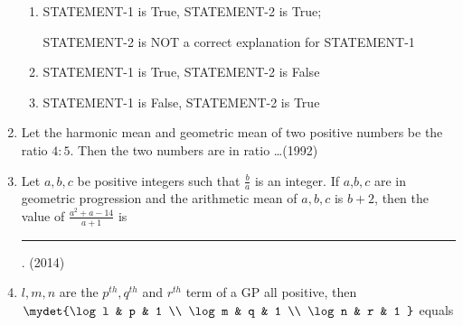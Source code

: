 \begin{enumerate}[label=\thesubsection.\arabic*,ref=\thesubsection.\theenumi]
\begin{enumerate}
\item STATEMENT-1 is True, STATEMENT-2 is True;

STATEMENT-2 is NOT a correct explanation for STATEMENT-1

\item STATEMENT-1 is True, STATEMENT-2 is False

\item STATEMENT-1 is False, STATEMENT-2 is True
\end{enumerate}
		  \item Let the harmonic mean and geometric mean of two positive numbers be the ratio $4:5$. Then the two numbers are in 
			  ratio \dots\hfill{(1992)}
          

   \item Let $a,b,c$ be positive integers such that $\frac{b}{a}$ is an integer. If $a$,$b,c$ are in geometric progression and the arithmetic mean of $a,b,c$ is $b + 2$, then the value of $\frac{a^{2} + a - 14}{a + 1}$ is \rule{1cm}{0.1pt}.
	   \hfill(2014)

\item {$l, m, n$ are the $p^{th}, q^{th}$ and $r^{th}$ term of a GP all positive, then $\mydet{\log l & p & 1 \\ \log m & q & 1 \\ \log n & r & 1 }$ equals}


\end{enumerate}
